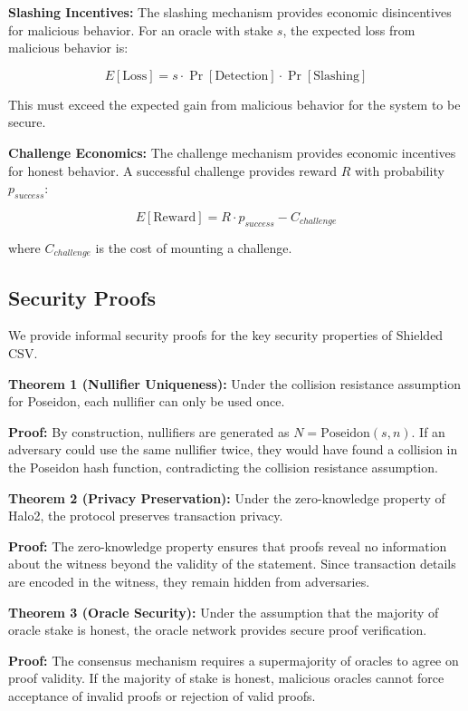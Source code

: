 \documentclass[11pt,a4paper]{article}
\begin{document}
\textbf{Slashing Incentives:}
The slashing mechanism provides economic disincentives for malicious behavior. For an oracle with stake $s$, the expected loss from malicious behavior is:

\begin{equation}
E[\text{Loss}] = s \cdot \Pr[\text{Detection}] \cdot \Pr[\text{Slashing}]
\end{equation}

This must exceed the expected gain from malicious behavior for the system to be secure.

\textbf{Challenge Economics:}
The challenge mechanism provides economic incentives for honest behavior. A successful challenge provides reward $R$ with probability $p_{success}$:

\begin{equation}
E[\text{Reward}] = R \cdot p_{success} - C_{challenge}
\end{equation}

where $C_{challenge}$ is the cost of mounting a challenge.

\subsection{Security Proofs}

We provide informal security proofs for the key security properties of Shielded CSV.

\textbf{Theorem 1 (Nullifier Uniqueness):}
Under the collision resistance assumption for Poseidon, each nullifier can only be used once.

\textbf{Proof:} By construction, nullifiers are generated as $N = \text{Poseidon}(s, n)$. If an adversary could use the same nullifier twice, they would have found a collision in the Poseidon hash function, contradicting the collision resistance assumption.

\textbf{Theorem 2 (Privacy Preservation):}
Under the zero-knowledge property of Halo2, the protocol preserves transaction privacy.

\textbf{Proof:} The zero-knowledge property ensures that proofs reveal no information about the witness beyond the validity of the statement. Since transaction details are encoded in the witness, they remain hidden from adversaries.

\textbf{Theorem 3 (Oracle Security):}
Under the assumption that the majority of oracle stake is honest, the oracle network provides secure proof verification.

\textbf{Proof:} The consensus mechanism requires a supermajority of oracles to agree on proof validity. If the majority of stake is honest, malicious oracles cannot force acceptance of invalid proofs or rejection of valid proofs.
\end{document}
